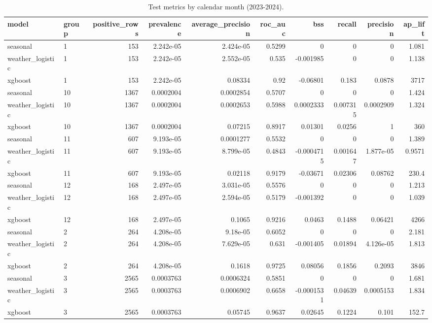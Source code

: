 \begin{table}
\caption{Test metrics by calendar month (2023-2024).}
\label{tab:T9_month}
\begin{tabular}{llrrrrrrrr}
\toprule
model & group & positive_rows & prevalence & average_precision & roc_auc & bss & recall & precision & ap_lift \\
\midrule
seasonal & 1 & 153 & 2.242e-05 & 2.424e-05 & 0.5299 & 0 & 0 & 0 & 1.081 \\
weather_logistic & 1 & 153 & 2.242e-05 & 2.552e-05 & 0.535 & -0.001985 & 0 & 0 & 1.138 \\
xgboost & 1 & 153 & 2.242e-05 & 0.08334 & 0.92 & -0.06801 & 0.183 & 0.0878 & 3717 \\
seasonal & 10 & 1367 & 0.0002004 & 0.0002854 & 0.5707 & 0 & 0 & 0 & 1.424 \\
weather_logistic & 10 & 1367 & 0.0002004 & 0.0002653 & 0.5988 & 0.0002333 & 0.007315 & 0.0002909 & 1.324 \\
xgboost & 10 & 1367 & 0.0002004 & 0.07215 & 0.8917 & 0.01301 & 0.0256 & 1 & 360 \\
seasonal & 11 & 607 & 9.193e-05 & 0.0001277 & 0.5532 & 0 & 0 & 0 & 1.389 \\
weather_logistic & 11 & 607 & 9.193e-05 & 8.799e-05 & 0.4843 & -0.0004715 & 0.001647 & 1.877e-05 & 0.9571 \\
xgboost & 11 & 607 & 9.193e-05 & 0.02118 & 0.9179 & -0.03671 & 0.02306 & 0.08762 & 230.4 \\
seasonal & 12 & 168 & 2.497e-05 & 3.031e-05 & 0.5576 & 0 & 0 & 0 & 1.213 \\
weather_logistic & 12 & 168 & 2.497e-05 & 2.594e-05 & 0.5179 & -0.001392 & 0 & 0 & 1.039 \\
xgboost & 12 & 168 & 2.497e-05 & 0.1065 & 0.9216 & 0.0463 & 0.1488 & 0.06421 & 4266 \\
seasonal & 2 & 264 & 4.208e-05 & 9.18e-05 & 0.6052 & 0 & 0 & 0 & 2.181 \\
weather_logistic & 2 & 264 & 4.208e-05 & 7.629e-05 & 0.631 & -0.001405 & 0.01894 & 4.126e-05 & 1.813 \\
xgboost & 2 & 264 & 4.208e-05 & 0.1618 & 0.9725 & 0.08056 & 0.1856 & 0.2093 & 3846 \\
seasonal & 3 & 2565 & 0.0003763 & 0.0006324 & 0.5851 & 0 & 0 & 0 & 1.681 \\
weather_logistic & 3 & 2565 & 0.0003763 & 0.0006902 & 0.6658 & -0.0001531 & 0.04639 & 0.0005153 & 1.834 \\
xgboost & 3 & 2565 & 0.0003763 & 0.05745 & 0.9637 & 0.02645 & 0.1224 & 0.101 & 152.7 \\

\end{tabular}
\end{table}
